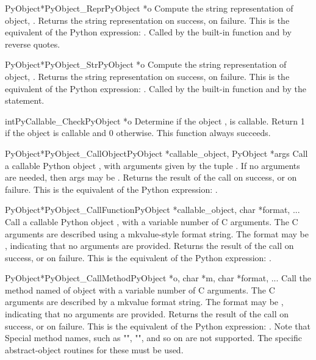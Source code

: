      \begin{cfuncdesc}{PyObject*}{PyObject_Repr}{PyObject *o}
	 Compute the string representation of object, .  Returns the
	 string representation on success, {\NULL} on failure.  This is
	 the equivalent of the Python expression: .
	 Called by the  built-in function and by reverse quotes.
     \end{cfuncdesc}


     \begin{cfuncdesc}{PyObject*}{PyObject_Str}{PyObject *o}
	 Compute the string representation of object, .  Returns the
	 string representation on success, {\NULL} on failure.  This is
	 the equivalent of the Python expression: .
	 Called by the  built-in function and by the 
	 statement.
     \end{cfuncdesc}


     \begin{cfuncdesc}{int}{PyCallable_Check}{PyObject *o}
	 Determine if the object , is callable.  Return 1 if the
	 object is callable and 0 otherwise.
	 This function always succeeds.
     \end{cfuncdesc}


     \begin{cfuncdesc}{PyObject*}{PyObject_CallObject}{PyObject *callable_object, PyObject *args}
	 Call a callable Python object , with
	 arguments given by the tuple .  If no arguments are
	 needed, then args may be {\NULL}.  Returns the result of the
	 call on success, or {\NULL} on failure.  This is the equivalent
	 of the Python expression: .
     \end{cfuncdesc}

     \begin{cfuncdesc}{PyObject*}{PyObject_CallFunction}{PyObject *callable_object, char *format, ...}
         Call a callable Python object , with a
         variable number of C arguments. The C arguments are described
         using a mkvalue-style format string. The format may be {\NULL},
         indicating that no arguments are provided.  Returns the
         result of the call on success, or {\NULL} on failure.  This is
         the equivalent of the Python expression: .
     \end{cfuncdesc}


     \begin{cfuncdesc}{PyObject*}{PyObject_CallMethod}{PyObject *o, char *m, char *format, ...}
         Call the method named  of object  with a variable number of
         C arguments.  The C arguments are described by a mkvalue
         format string.  The format may be {\NULL}, indicating that no
         arguments are provided. Returns the result of the call on
         success, or {\NULL} on failure.  This is the equivalent of the
         Python expression: .
         Note that Special method names, such as "",
         "", and so on are not supported. The specific
         abstract-object routines for these must be used.
     \end{cfuncdesc}


